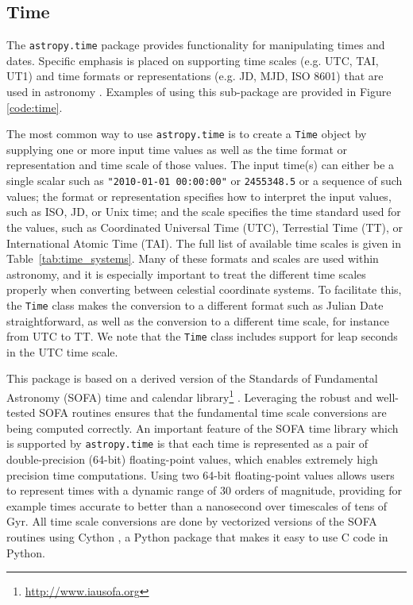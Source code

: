 \documentclass[traditabstract]{aa}
\begin{document}
\subsection{Time}

\label{sec:time}

The \texttt{astropy.time} package provides functionality for manipulating times
and dates. Specific emphasis is placed on supporting time scales (e.g. UTC,
TAI, UT1) and time formats or representations (e.g. JD, MJD, ISO 8601) that are
used in astronomy \citep{guinot88,kovalevsky01,sofa_wallace}. Examples of using this sub-package are provided in Figure
\ref{code:time}.

The most common way to use \texttt{astropy.time} is to create a \texttt{Time}
object by supplying one or more input time values as well as the time
format or representation and time scale of those values. The input time(s) can
either be a single scalar such as \verb|"2010-01-01 00:00:00"| or \verb|2455348.5|
or a sequence of such values; the format or representation specifies how to
interpret the input values, such as ISO, JD, or Unix time; and the scale
specifies the time standard used for the values, such as Coordinated Universal
Time (UTC), Terrestial Time (TT), or International Atomic Time (TAI). The full
list of available time scales is given in Table~\ref{tab:time_systems}. Many
of these formats and scales are used within astronomy, and it is especially
important to treat the different time scales properly when converting between
celestial coordinate systems. To facilitate this, the \texttt{Time} class makes
the conversion to a different format such as Julian Date straightforward, as
well as the conversion to a different time scale, for instance from UTC to TT.
We note that the \texttt{Time} class includes support for leap seconds
in the UTC time scale.

This package is based on a derived version of the Standards of Fundamental
Astronomy (SOFA) time and calendar
library\footnote{\url{http://www.iausofa.org}} \citep{sofa_wallace}.
Leveraging the robust and well-tested SOFA routines ensures that the
fundamental time scale conversions are being computed correctly. An important
feature of the SOFA time library which is supported by \texttt{astropy.time} is
that each time is represented as a pair of double-precision (64-bit)
floating-point values, which enables extremely high precision time
computations. Using two 64-bit floating-point values allows users to represent
times with a dynamic range of 30 orders of magnitude, providing for example times
accurate to better than a nanosecond over timescales of tens of Gyr. All time
scale conversions are done by vectorized versions of the SOFA routines using
Cython \citep{cython}, a Python package
that makes it easy to use C code in Python.
\end{document}

